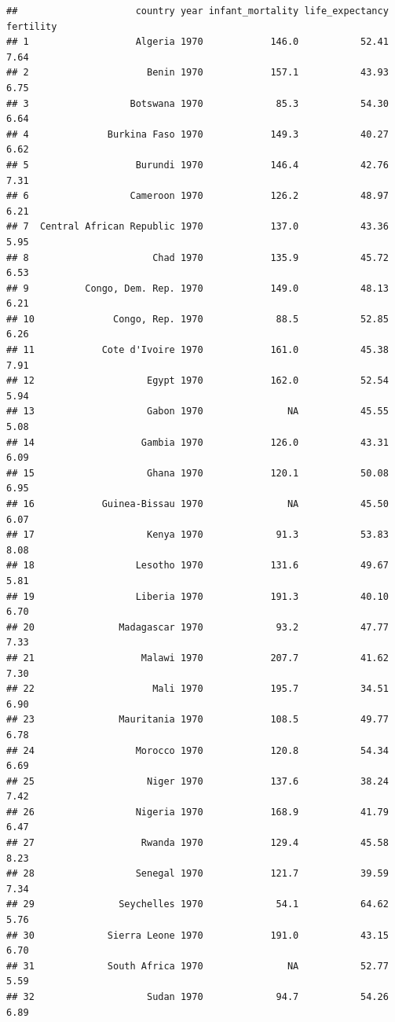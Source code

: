 \documentclass[
]{article}
\begin{document}
\begin{verbatim}
##                     country year infant_mortality life_expectancy fertility
## 1                   Algeria 1970            146.0           52.41      7.64
## 2                     Benin 1970            157.1           43.93      6.75
## 3                  Botswana 1970             85.3           54.30      6.64
## 4              Burkina Faso 1970            149.3           40.27      6.62
## 5                   Burundi 1970            146.4           42.76      7.31
## 6                  Cameroon 1970            126.2           48.97      6.21
## 7  Central African Republic 1970            137.0           43.36      5.95
## 8                      Chad 1970            135.9           45.72      6.53
## 9          Congo, Dem. Rep. 1970            149.0           48.13      6.21
## 10              Congo, Rep. 1970             88.5           52.85      6.26
## 11            Cote d'Ivoire 1970            161.0           45.38      7.91
## 12                    Egypt 1970            162.0           52.54      5.94
## 13                    Gabon 1970               NA           45.55      5.08
## 14                   Gambia 1970            126.0           43.31      6.09
## 15                    Ghana 1970            120.1           50.08      6.95
## 16            Guinea-Bissau 1970               NA           45.50      6.07
## 17                    Kenya 1970             91.3           53.83      8.08
## 18                  Lesotho 1970            131.6           49.67      5.81
## 19                  Liberia 1970            191.3           40.10      6.70
## 20               Madagascar 1970             93.2           47.77      7.33
## 21                   Malawi 1970            207.7           41.62      7.30
## 22                     Mali 1970            195.7           34.51      6.90
## 23               Mauritania 1970            108.5           49.77      6.78
## 24                  Morocco 1970            120.8           54.34      6.69
## 25                    Niger 1970            137.6           38.24      7.42
## 26                  Nigeria 1970            168.9           41.79      6.47
## 27                   Rwanda 1970            129.4           45.58      8.23
## 28                  Senegal 1970            121.7           39.59      7.34
## 29               Seychelles 1970             54.1           64.62      5.76
## 30             Sierra Leone 1970            191.0           43.15      6.70
## 31             South Africa 1970               NA           52.77      5.59
## 32                    Sudan 1970             94.7           54.26      6.89

\end{verbatim}
\end{document}
